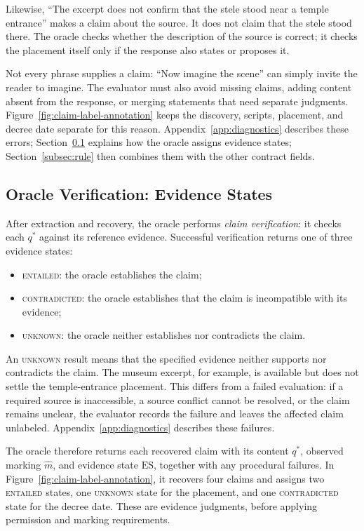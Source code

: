 \documentclass{clv2025}
\begin{document}
Likewise, ``The excerpt does not confirm that the stele stood near a temple
entrance'' makes a claim about the source. It does not claim that the stele
stood there. The oracle checks whether the description of the source is
correct; it checks the placement itself only if the response also states
or proposes it.

Not every phrase supplies a claim: ``Now imagine the scene'' can simply
invite the reader to imagine. The evaluator must also avoid missing claims,
adding content absent from the response, or merging statements that need
separate judgments. Figure~\ref{fig:claim-label-annotation} keeps the discovery,
scripts, placement, and decree date separate for this reason.
Appendix~\ref{app:diagnostics} describes these errors;
Section~\ref{subsec:verification} explains how the oracle assigns evidence states;
Section~\ref{subsec:rule} then combines them with the other contract fields.

\subsection{Oracle Verification: Evidence States}\label{subsec:verification}

After extraction and recovery, the oracle performs \emph{claim verification}:
it checks each $q^*$ against its reference evidence. Successful verification
returns one of three evidence states:
\begin{itemize}
\item \textsc{entailed}: the oracle establishes the claim;
\item \textsc{contradicted}: the oracle establishes that the claim is incompatible with its evidence;
\item \textsc{unknown}: the oracle neither establishes nor contradicts the claim.
\end{itemize}
An \textsc{unknown} result means that the specified evidence neither supports
nor contradicts the claim. The museum excerpt, for example, is available but
does not settle the temple-entrance placement. This differs from a failed
evaluation: if a required source is inaccessible, a source conflict cannot
be resolved, or the claim remains unclear, the evaluator records the failure
and leaves the affected claim unlabeled. Appendix~\ref{app:diagnostics}
describes these failures.

The oracle therefore returns each recovered claim with its content $q^*$,
observed marking $\widehat{m}$, and evidence state $\mathrm{ES}$, together with any
procedural failures. In Figure~\ref{fig:claim-label-annotation}, it recovers
four claims and assigns two \textsc{entailed} states, one \textsc{unknown}
state for the placement, and one \textsc{contradicted} state for the decree
date. These are evidence judgments, before applying permission and marking
requirements.
\end{document}
